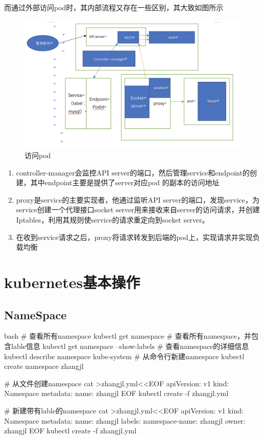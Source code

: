 而通过外部访问pod时，其内部流程又存在一些区别，其大致如图所示
\begin{figure}[H]
    \centering
    \includegraphics[scale=0.4]{visit_pod.png}
    \caption{访问pod}
    \label{fig:visit_pod}
\end{figure}
\begin{enumerate}
    \item controller-manager会监控API server的端口，然后管理service和endpoint的创建，其中endpoint主要是提供了server对应pod 的副本的访问地址
    \item proxy是service的主要实现者，他通过监听API server的端口，发现service，为service创建一个代理接口socket server用来接收来自server的访问请求，并创建Iptables，利用其规则使service的请求重定向到socket server。
    \item 在收到service请求之后，proxy将请求转发到后端的pod上，实现请求并实现负载均衡
\end{enumerate}

\section{kubernetes基本操作}

\subsection{NameSpace}
\begin{code-block}{bash}
# 查看所有namespace
kubectl get namespace
# 查看所有namespace，并包含lable信息
kubectl get namespace --show-labels
# 查看namespace的详细信息
kubectl describe namespace kube-system
# 从命令行新建namespace
kubectl create namespace zhangjl

# 从文件创建namespace
cat >zhangjl.yml<<EOF
apiVersion: v1
kind: Namespace
metadata:
  name: zhangjl
EOF
kubectl create -f zhangjl.yml

# 新建带有lable的namespace
cat >zhangjl.yml<<EOF
apiVersion: v1
kind: Namespace
metadata:
  name: zhangjl
  labels:
    namespace-name: zhangjl
    owner: zhangjl
EOF
kubectl create -f zhangjl.yml
\end{code-block}

